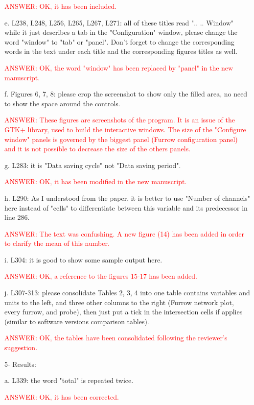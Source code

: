 \documentclass[a4paper]{article}
\begin{document}
\textcolor{red}{ANSWER: OK, it has been included.}

e. L238, L248, L256, L265, L267, L271: all of these titles read ".. .. Window" while it just describes a tab in the "Configuration" window, please change the word "window" to "tab" or "panel". Don't forget to change the corresponding words in the text under each title and the corresponding figures titles as well.

\textcolor{red}{ANSWER: OK, the word "window" has been replaced by "panel" in
the new manuscript.}

f. Figures 6, 7, 8: please crop the screenshot to show only the filled area, no need to show the space around the controls.

\textcolor{red}{ANSWER: These figures are screenshots of the program. It is an
issue of the GTK+ library, used to build the interactive windows. The size of
the "Configure window" panels is governed by the biggest panel (Furrow
configuration panel) and it is not possible to decrease the size of the others
panels.}

g. L283: it is "Data saving cycle" not "Data saving period".

\textcolor{red}{ANSWER: OK, it has been modified in the new manuscript.}

h. L290: As I understood from the paper, it is better to use "Number of channels" here instead of "cells" to differentiate between this variable and its predecessor in line 286.

\textcolor{red}{ANSWER: The text was confushing. A new figure (14) has been
added in order to clarify the mean of this number.}

i. L304: it is good to show some sample output here.

\textcolor{red}{ANSWER: OK, a reference to the figures 15-17 has been added.}

j. L307-313: please consolidate Tables 2, 3, 4 into one table contains variables and units to the left, and three other columns to the right (Furrow network plot, every furrow, and probe), then just put a tick in the intersection cells if applies (similar to software versions comparison tables).

\textcolor{red}{ANSWER: OK, the tables have been consolidated following the
reviewer's suggestion.}

5- Results:

a. L339: the word "total" is repeated twice.

\textcolor{red}{ANSWER: OK, it has been corrected.}
\end{document}

